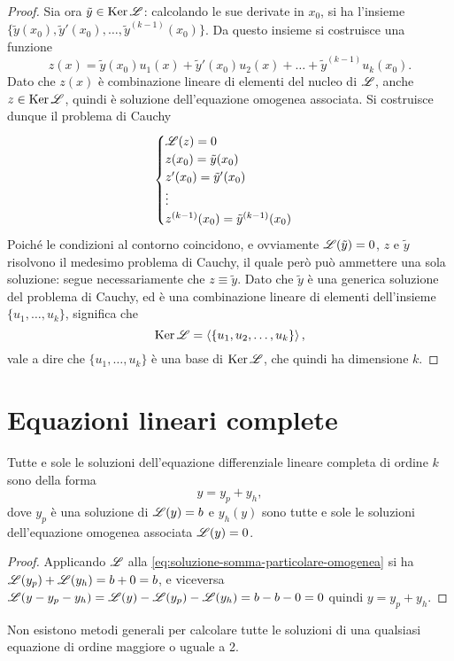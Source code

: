 \begin{proof}
Sia ora $\tilde{y}\in\operatorname{Ker}\mathscr L$: calcolando le sue derivate in $x_0$, si ha l'insieme $\{\tilde{y}(x_0),\tilde{y}'(x_0),\dots,\tilde{y}^{(k-1)}(x_0)\}$. Da questo insieme si costruisce una funzione
\begin{equation*}
	z(x)=\tilde{y}(x_0)u_1(x)+\tilde{y}'(x_0)u_2(x)+\dots+\tilde{y}^{(k-1)}u_k(x_0).
\end{equation*}
Dato che $z(x)$ è combinazione lineare di elementi del nucleo di $\mathscr L$, anche $z\in\operatorname{Ker}\mathscr L$, quindi è soluzione dell'equazione omogenea associata. Si costruisce dunque il problema di Cauchy
\begin{equation*}
	\begin{cases}
		\mathscr L(z)=0\\z(x_0)=\tilde{y}(x_0)\\
		z'(x_0)=\tilde{y}'(x_0)\\
		\vdots\\
		z^{(k-1)}(x_0)=\tilde{y}^{(k-1)}(x_0)
	\end{cases}
\end{equation*}
Poiché le condizioni al contorno coincidono, e ovviamente $\mathscr L(\tilde{y})=0$, $z$ e $\tilde{y}$ risolvono il medesimo problema di Cauchy, il quale però può ammettere una sola soluzione: segue necessariamente che $z\equiv\tilde{y}$. Dato che $\tilde{y}$ è una generica soluzione del problema di Cauchy, ed è una combinazione lineare di elementi dell'insieme $\{u_1,\dots,u_k\}$, significa che
\begin{equation*}
	\operatorname{Ker}\mathscr L=\left\langle{\{u_1,u_2,\dots,u_k\}}\right\rangle,
\end{equation*}
vale a dire che $\{u_1,\dots,u_k\}$ è una base di $\operatorname{Ker}\mathscr L$, che quindi ha dimensione $k$.
\end{proof}

\section{Equazioni lineari complete}
\begin{teorema}
Tutte e sole le soluzioni dell'equazione differenziale lineare completa di ordine $k$ sono della forma
\begin{equation} \label{eq:soluzione-somma-particolare-omogenea}
	y=y_p+y_h,
\end{equation}
dove $y_p$ è una soluzione di $\mathscr L(y)=b$ e $y_h(y)$ sono tutte e sole le soluzioni dell'equazione omogenea associata $\mathscr L(y)=0$.
\end{teorema}
\begin{proof}
Applicando $\mathscr L$ alla \eqref{eq:soluzione-somma-particolare-omogenea} si ha $\mathscr L(y_p)+\mathscr L(y_h)=b+0=b$, e viceversa $\mathscr L(y-y_p-y_h)=\mathscr L(y)-\mathscr L(y_p)-\mathscr L(y_h)=b-b-0=0$ quindi $y=y_p+y_h$.
\end{proof}
Non esistono metodi generali per calcolare tutte le soluzioni di una qualsiasi equazione di ordine maggiore o uguale a 2.

